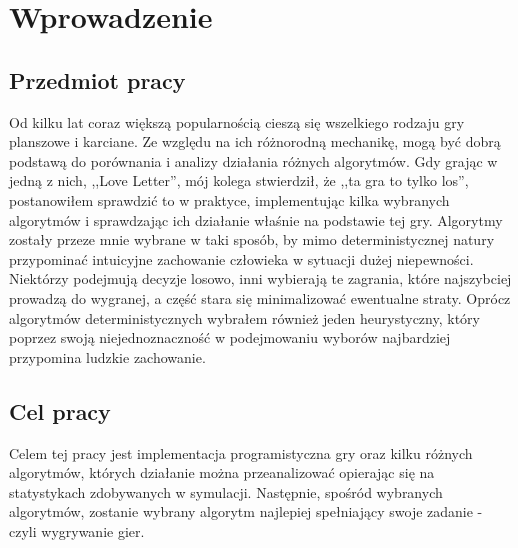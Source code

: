 \chapter{Wprowadzenie}
\label{cha:rozdz1}
\section{Przedmiot pracy}
\label{sec:przedmiotPracy}

Od kilku lat coraz większą popularnością cieszą się wszelkiego rodzaju gry planszowe i karciane. Ze względu na ich różnorodną mechanikę, mogą być dobrą podstawą do porównania i analizy działania różnych algorytmów. Gdy grając w jedną z nich, ,,Love Letter'', mój kolega stwierdził, że ,,ta gra to tylko los'', postanowiłem sprawdzić to w praktyce, implementując kilka wybranych algorytmów i sprawdzając ich działanie właśnie na podstawie tej gry. 
Algorytmy zostały przeze mnie wybrane w taki sposób, by mimo deterministycznej natury przypominać intuicyjne zachowanie człowieka w sytuacji dużej niepewności. Niektórzy podejmują decyzje losowo, inni wybierają te zagrania, które najszybciej prowadzą do wygranej, a część stara się minimalizować ewentualne straty. Oprócz algorytmów deterministycznych wybrałem również jeden heurystyczny, który poprzez swoją niejednoznaczność w podejmowaniu wyborów najbardziej przypomina ludzkie zachowanie.

\section{Cel pracy}
\label{sec:zawartoscPracy}
Celem tej pracy jest implementacja programistyczna gry oraz kilku różnych algorytmów, których działanie można przeanalizować opierając się na statystykach zdobywanych w symulacji. Następnie, spośród wybranych algorytmów, zostanie wybrany algorytm najlepiej spełniający swoje zadanie - czyli wygrywanie gier.

